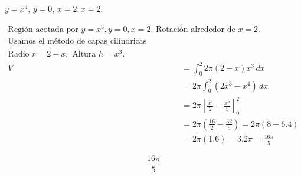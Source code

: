 $y=x^3$, $y=0$, $x=2;x=2$.

\nopagebreak
\begin{align*}
\text{Región acotada por } y=x^3, y=0, x=2. \text{ Rotación alrededor de } x=2. \\
\text{Usamos el método de capas cilíndricas (shells).} \\
\text{Radio } r = 2-x, \text{ Altura } h = x^3. \\
V &= \int_{0}^{2} 2\pi (2-x) x^3 \, dx \\
&= 2\pi \int_{0}^{2} (2x^3 - x^4) \, dx \\
&= 2\pi \left[ \frac{x^4}{2} - \frac{x^5}{5} \right]_{0}^{2} \\
&= 2\pi \left( \frac{16}{2} - \frac{32}{5} \right) = 2\pi \left( 8 - 6.4 \right) \\
&= 2\pi (1.6) = 3.2\pi = \frac{16\pi}{5}
\end{align*}

\[
\boxed{\displaystyle \frac{16\pi}{5}}
\]
